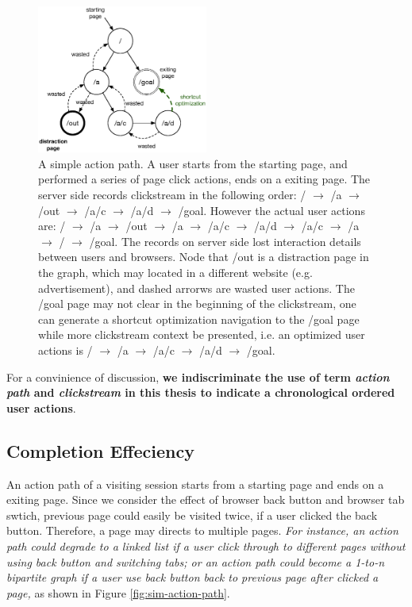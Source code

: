 \begin{figure}[H]
    \centering
    \includegraphics[width=0.5\textwidth]{figures/clickstream}
    \caption{A simple action path. A user starts from the starting page, and performed
    a series of page click actions, ends on a exiting page. 
    The server side records clickstream in the following order:
    / $\rightarrow$ /a $\rightarrow$ /out $\rightarrow$ /a/c $\rightarrow$ /a/d $\rightarrow$ /goal.
    However the actual user actions are: 
    / $\rightarrow$ /a $\rightarrow$ /out $\rightarrow$ /a $\rightarrow$ /a/c $\rightarrow$ /a/d 
    $\rightarrow$ /a/c $\rightarrow$ /a $\rightarrow$ / $\rightarrow$ /goal. 
    The records on server side lost interaction details between users and browsers.
    Node that /out is a distraction page in the graph, 
    which may located in a different website (e.g. advertisement), 
    and dashed arrorws are wasted user
    actions. The /goal page may not clear in the beginning of the clickstream, one can generate
    a shortcut optimization navigation to the /goal page while more clickstream context
    be presented, i.e. an optimized user actions is 
    / $\rightarrow$ /a $\rightarrow$ /a/c $\rightarrow$ /a/d $\rightarrow$ /goal.}
    \label{fig:clickstream}
\end{figure}

For a convinience of discussion, \textbf{we indiscriminate the use of 
term \emph{action path} and \emph{clickstream} in
this thesis to indicate a chronological ordered user actions}.

\subsection{Completion Effeciency}

An action path of a visiting session starts from a starting page and ends on a exiting page.
Since we consider the effect of browser back button and browser tab swtich, previous page could
easily be visited twice, if a user clicked the back button. Therefore, a page may directs
to multiple pages. \emph{For instance, an action path could degrade to a linked list if a user
click through to different pages without using back button and switching tabs; or an action
path could become a 1-to-n bipartite graph if a user use back button back to previous page
after clicked a page,} as shown in Figure \ref{fig:sim-action-path}.

